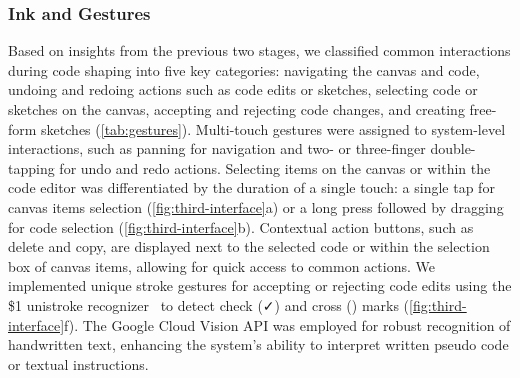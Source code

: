 \subsubsection{Ink and Gestures}
Based on insights from the previous two stages, we classified common interactions during code shaping into five key categories: navigating the canvas and code, undoing and redoing actions such as code edits or sketches, selecting code or sketches on the canvas, accepting and rejecting code changes, and creating free-form sketches (\autoref{tab:gestures}).
Multi-touch gestures were assigned to system-level interactions, such as panning for navigation and two- or three-finger double-tapping for undo and redo actions. Selecting items on the canvas or within the code editor was differentiated by the duration of a single touch: a single tap for canvas items selection (\autoref{fig:third-interface}a) or a long press followed by dragging for code selection (\autoref{fig:third-interface}b). Contextual action buttons, such as delete and copy, are displayed next to the selected code or within the selection box of canvas items, allowing for quick access to common actions.
We implemented unique stroke gestures for accepting or rejecting code edits using the \$1 unistroke recognizer~\cite{10.1145/1294211.1294238} to detect check (\faCheck) and cross (\faTimes) marks (\autoref{fig:third-interface}f). The Google Cloud Vision API was employed for robust recognition of handwritten text, enhancing the system's ability to interpret written pseudo code or textual instructions.


